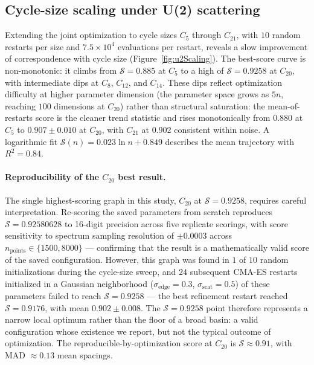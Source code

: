 \documentclass[cntp]{ipart}
\theoremstyle{plain}
\theoremstyle{remark}
\begin{document}
\subsection{Cycle-size scaling under U(2) scattering}
\label{sec:results-scaling}

Extending the joint optimization to cycle sizes $C_5$ through $C_{21}$, with $10$ random restarts per size and $7.5 \times 10^4$ evaluations per restart, reveals a slow improvement of correspondence with cycle size (Figure~\ref{fig:u2Scaling}). The best-score curve is non-monotonic: it climbs from $\mathcal{S} = 0.885$ at $C_5$ to a high of $\mathcal{S} = 0.9258$ at $C_{20}$, with intermediate dips at $C_8$, $C_{12}$, and $C_{14}$. These dips reflect optimization difficulty at higher parameter dimension (the parameter space grows as $5n$, reaching $100$ dimensions at $C_{20}$) rather than structural saturation: the mean-of-restarts score is the cleaner trend statistic and rises monotonically from $0.880$ at $C_5$ to $0.907 \pm 0.010$ at $C_{20}$, with $C_{21}$ at $0.902$ consistent within noise. A logarithmic fit $\mathcal{S}(n) = 0.023 \ln n + 0.849$ describes the mean trajectory with $R^2 = 0.84$.

\paragraph{Reproducibility of the $C_{20}$ best result.} The single highest-scoring graph in this study, $C_{20}$ at $\mathcal{S} = 0.9258$, requires careful interpretation. Re-scoring the saved parameters from scratch reproduces $\mathcal{S} = 0.92580628$ to 16-digit precision across five replicate scorings, with score sensitivity to spectrum sampling resolution of $\pm 0.0003$ across $n_{\mathrm{points}} \in \{1500, 8000\}$ --- confirming that the result is a mathematically valid score of the saved configuration. However, this graph was found in $1$ of $10$ random initializations during the cycle-size sweep, and $24$ subsequent CMA-ES restarts initialized in a Gaussian neighborhood ($\sigma_{\mathrm{edge}} = 0.3$, $\sigma_{\mathrm{scat}} = 0.5$) of these parameters failed to reach $\mathcal{S} = 0.9258$ --- the best refinement restart reached $\mathcal{S} = 0.9176$, with mean $0.902 \pm 0.008$. The $\mathcal{S} = 0.9258$ point therefore represents a narrow local optimum rather than the floor of a broad basin: a valid configuration whose existence we report, but not the typical outcome of optimization. The reproducible-by-optimization score at $C_{20}$ is $\mathcal{S} \approx 0.91$, with MAD $\approx 0.13$ mean spacings.
\end{document}
